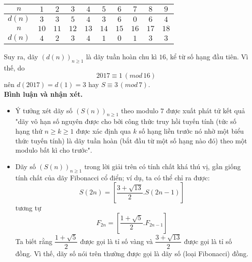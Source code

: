 \begin{bt}
{\begin{center}
	
	\begin{tabular}{|c|c|c|c|c|c|c|c|c|c|}
		\hline $n$& $1$&$2$& $3$&$4$& $5$&$6$& $7$&$8$& $9$\\
		\hline $d(n)$& $3$&$3$& $5$&$4$& $3$&$6$& $0$&$6$& $4$\\
		\hline $n$& $10$&$11$& $12$&$13$& $14$&$15$& $16$&$17$& $18$\\
		\hline $d(n)$& $4$&$2$& $3$&$4$& $1$&$0$& $1$&$3$& $3$\\
		\hline
	\end{tabular}
\end{center}
Suy ra, dãy $\left(d(n)\right)_{n\geq 1}$ là dãy tuần hoàn chu kì $16$, kể từ số hạng đầu tiên. Vì thế, do $$2017\equiv 1\, (mod\, 16)$$
nên $d(2017)=d(1)=3$ hay $S\equiv 3\,(mod\, 7)$.\\
\textbf{Bình luận và nhận xét.}
\begin{itemize}
	\item  Ý tưởng xét dãy số $\left(S(n)\right)_{n\geq 1}$ theo modulo $7$ được xuất phát tử kết quả "dãy vô hạn số nguyên được cho bởi công thức truy hồi tuyến tính (tức số hạng thứ $n\geq k\geq 1$ được xác định qua $k$ số hạng liền trước nó nhờ một biểu thức tuyến tính) là dãy tuần hoàn (bắt đầu từ một số hạng nào đó) theo một modulo bất kì cho trước". 
	\item  Dãy số $\left(S(n)\right)_{n\geq 1}$ trong lời giải trên có tính chất khá thú vị, gần giống tính chất của dãy Fibonacci cổ điển; ví dụ, ta có thể chỉ ra được:
$$S(2n)=\left[\dfrac{3+\sqrt{13}}{2}.S(2n-1)\right]$$ 
tương tự $$F_{2n}=\left[\dfrac{1+\sqrt{5}}{2}.F_{2n-1}\right]$$
Ta biết rằng $\dfrac{1+\sqrt{5}}{2}$ được gọi là tỉ số vàng và $\dfrac{3+\sqrt{13}}{2}$ được gọi là tỉ số đồng. Vì thế, dãy số nói trên thường được gọi là dãy số (loại Fibonacci) đồng.
\end{itemize}
}
\end{bt}
